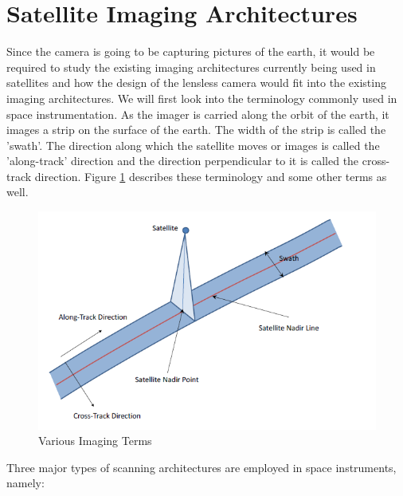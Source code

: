 \section{Satellite Imaging Architectures}
Since the camera is going to be capturing pictures of the earth, it would be required to study the existing imaging architectures currently being used in satellites and how the design of the lensless camera would fit into the existing imaging architectures. We will first look into the terminology commonly used in space instrumentation. As the imager is carried along the orbit of the earth, it images a strip on the surface of the earth. The width of the strip is called the 'swath'. The direction along which the satellite moves or images is called the 'along-track' direction and the direction perpendicular to it is called the cross-track direction\cite{ImagingGeo}. Figure \ref{fig:ImagingGeo} describes these terminology and some other terms as well.  
\begin{figure}[ht]
\includegraphics[width=\textwidth]{pics/imaginggeo}
\caption{Various Imaging Terms\cite{ImagingGeo}}
\label{fig:ImagingGeo}
\end{figure}
Three major types of scanning architectures are employed in space instruments, namely:

